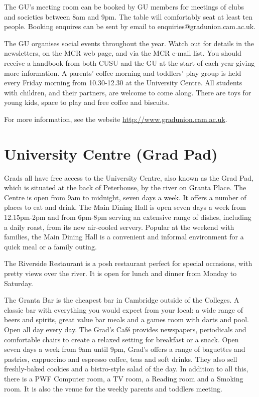 \documentclass[11pt,fleqn, oneside]{book} %
\begin{document}
The GU's meeting room can be booked by GU members for meetings of clubs and societies between 8am and 9pm. The table will comfortably seat at least ten people. Booking enquires can be sent by email to enquiries@gradunion.cam.ac.uk.
    
The GU organises social events throughout the year. Watch out for details in the newsletters, on the MCR web page, and via the MCR e-mail list. You should receive a handbook from both CUSU and the GU at the start of each year giving more information.
A parents' coffee morning and toddlers' play group is held every Friday morning from 10.30-12.30 at the University Centre. All students with children, and their partners, are welcome to come along. There are toys for young kids, space to play and free coffee and biscuits.
    
For more information, see the website \url{http://www.gradunion.cam.ac.uk}. 
    
\section{University Centre (Grad Pad)}
    
Grads all have free access to the University Centre, also known as the Grad Pad, which is situated at the back of Peterhouse, by the river on Granta Place. The Centre is open from 9am to midnight, seven days a week. It offers a number of places to eat and drink.  
The Main Dining Hall is open seven days a week from 12.15pm-2pm and from 6pm-8pm serving an extensive range of dishes, including a daily roast, from its new air-cooled servery. Popular at the weekend with families, the Main Dining Hall is a convenient and informal environment for a quick meal or a family outing. 
    
The Riverside Restaurant is a posh restaurant perfect for special occasions, with pretty views over the river.  It is open for lunch and dinner from Monday to Saturday.
    
The Granta Bar is the cheapest bar in Cambridge outside of the Colleges. A classic bar with everything you would expect from your local: a wide range of beers and spirits, great value bar meals and a games room with darts and pool. Open all day every day.
The Grad's Café provides newspapers, periodicals and comfortable chairs to create a relaxed setting for breakfast or a snack. Open seven days a week from 9am until 9pm, Grad's offers a range of baguettes and pastries, cappuccino and espresso coffee, teas and soft drinks. They also sell freshly-baked cookies and a bistro-style salad of the day. 
In addition to all this, there is a PWF Computer room, a TV room, a Reading room and a Smoking room. It is also the venue for the weekly parents and toddlers meeting.
    
\end{document}
